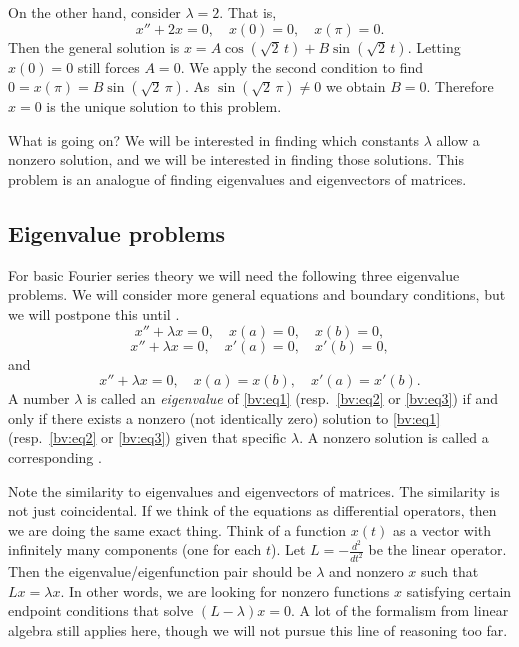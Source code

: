 \begin{example}
On the other hand, consider $\lambda = 2$.  That is,
\begin{equation*}
x'' + 2 x = 0, \quad x(0) = 0, \quad x(\pi) = 0.
\end{equation*}
Then the general solution is
$x= A \cos ( \sqrt{2}\,t) + B \sin ( \sqrt{2}\,t)$.  Letting $x(0) = 0$ still
forces $A = 0$.  We apply the second condition to find
$0=x(\pi) = B \sin ( \sqrt{2}\,\pi)$.
As $\sin ( \sqrt{2}\,\pi) \not= 0$ we obtain
$B = 0$.  Therefore $x=0$ is the unique solution to this problem.
\end{example}

What is going on?  We will be interested in finding which
constants $\lambda$ allow a nonzero solution, and we will be interested in
finding those solutions.  This problem is an analogue of finding
eigenvalues and eigenvectors of matrices.  

\subsection{Eigenvalue problems}

For basic Fourier series theory we will need
the following three eigenvalue problems.
We will consider more general equations and boundary conditions,
but we will postpone this until
.
\begin{equation} \label{bv:eq1}
x'' + \lambda x = 0, \quad x(a) = 0, \quad x(b) = 0 ,
\end{equation}
\begin{equation} \label{bv:eq2}
x'' + \lambda x = 0, \quad x'(a) = 0, \quad x'(b) = 0 ,
\end{equation}
and
\begin{equation} \label{bv:eq3}
x'' + \lambda x = 0, \quad x(a) = x(b), \quad x'(a) = x'(b) .
\end{equation}
A number $\lambda$ is called an
\emph{eigenvalue}
of \eqref{bv:eq1}
(resp.\ \eqref{bv:eq2} or \eqref{bv:eq3}) if and only if
there exists a nonzero (not identically zero) solution to \eqref{bv:eq1}
(resp.\ \eqref{bv:eq2} or \eqref{bv:eq3})
given that specific $\lambda$.  A
nonzero solution is called a corresponding
\emph{}.

Note the similarity to eigenvalues and eigenvectors of matrices.  The
similarity is not just coincidental.  If we think of the equations as
differential operators, then we are doing the same exact thing.
Think of a function $x(t)$
as a vector with infinitely many components (one for each $t$).
Let $L = -\frac{d^2}{{dt}^2}$ be the linear operator.
Then the eigenvalue/eigenfunction pair should be $\lambda$ and
nonzero $x$ such that $Lx = \lambda x$.
In other words,
we are looking for nonzero functions $x$
satisfying certain endpoint conditions that solve
$(L- \lambda)x = 0$.  A lot of the formalism from linear algebra still
applies here, though we will not pursue this line of reasoning too far.

